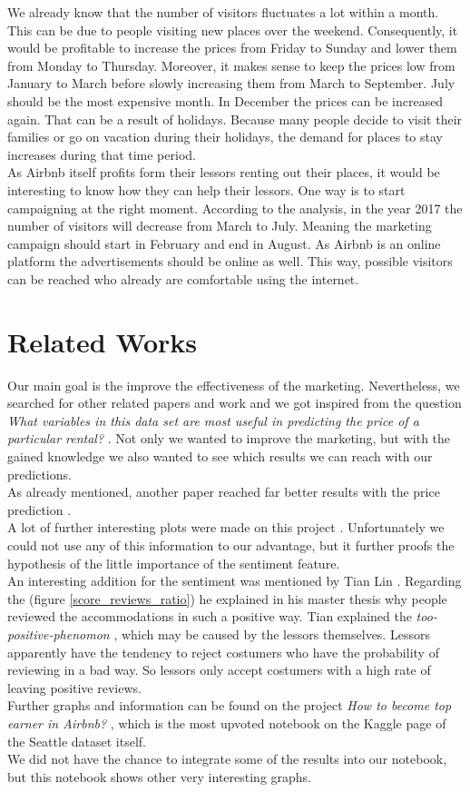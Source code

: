 \documentclass[journal]{IEEEtran}
\begin{document}
We already know that the number of visitors fluctuates a lot within a month. This can be due to people visiting new places over the weekend. Consequently, it would be profitable to increase the prices from Friday to Sunday and lower them from Monday to Thursday. Moreover, it makes sense to keep the prices low from January to March before slowly increasing them from March to September. July should be the most expensive month. In December the prices can be increased again. That can be a result of holidays. Because many people decide to visit their families or go on vacation during their holidays, the demand for places to stay increases during that time period. \\
As Airbnb itself profits form their lessors renting out their places, it would be interesting to know how they can help their lessors. One way is to start campaigning at the right moment. According to the analysis, in the year 2017 the number of visitors will decrease from March to July. Meaning the marketing campaign should start in February and end in August. As Airbnb is an online platform the advertisements should be online as well. This way, possible visitors can be reached who already are comfortable using the internet. 
%
\section{Related Works}
\noindent Our main goal is the improve the effectiveness of the marketing. Nevertheless, we searched for other related papers and work and we got inspired from the question \textit{What variables in this data set are most useful in predicting the price of a particular rental?} \cite{RN2}. Not only we wanted to improve the marketing, but with the gained knowledge we also wanted to see which results we can reach with our predictions. \\
 As already mentioned, another paper reached far better results with the price prediction \cite{RN1}. \\
 A lot of further interesting plots were made on this project \cite{RN4}. Unfortunately we could not use any of this information to our advantage, but it further proofs the hypothesis of the little importance of the sentiment feature. \\
 An interesting addition for the sentiment was mentioned by Tian Lin \cite{RN3}. Regarding the (figure \ref{score_reviews_ratio}) he explained in his master thesis why people reviewed the accommodations in such a positive way. Tian explained the \textit{too-positive-phenomon} \cite{RN3}, which may be caused by the lessors themselves. Lessors apparently have the tendency to reject costumers who have the probability of reviewing in a bad way. So lessors only accept costumers with a high rate of leaving positive reviews. \\
 Further graphs and information can be found on the project \textit{How to become top earner in Airbnb?} \cite{RN5}, which is the most upvoted notebook on the Kaggle page of the Seattle dataset itself. \\
 We did not have the chance to integrate some of the results into our notebook, but this notebook shows other very interesting graphs. 
 
\end{document}
